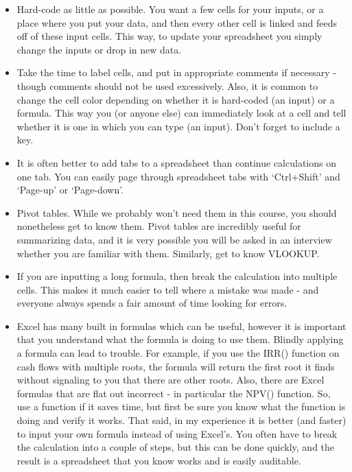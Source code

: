 \documentclass[11pt]{article}
\begin{document}
\begin{itemize}
\item Hard-code as little as possible.  You want a few cells for your inputs, or a place where you put your data, and then every other cell is linked and feeds off of these input cells. This way, to update your spreadsheet you simply change the inputs or drop in new data.
\item Take the time to label cells, and put in appropriate comments if necessary  - though comments should not be used excessively. Also, it is common to change the cell color depending on whether it is hard-coded (an input) or a formula.  This way you (or anyone else) can immediately look at a cell and tell whether it is one in which you can type (an input).  Don't forget to include a key.
\item It is often better to add tabs to a spreadsheet than continue calculations on one tab.  You can easily page through spreadsheet tabs with `Ctrl+Shift' and `Page-up' or `Page-down'.
\item Pivot tables.  While we probably won't need them in this course, you should nonetheless get to know them.  Pivot tables are incredibly useful for summarizing data, and it is very possible you will be asked in an interview whether you are familiar with them.  Similarly, get to know VLOOKUP.
\item If you are inputting a long formula, then break the calculation into multiple cells.  This makes it much easier to tell where a mistake was made - and everyone always spends a fair amount of time looking for errors.
\item Excel has many built in formulas which can be useful, however it is important that you understand what the formula is doing to use them.  Blindly applying a formula can lead to trouble.  For example, if you use the IRR() function on cash flows with multiple roots, the formula will return the first root it finds without signaling to you that there are other roots.  Also, there are Excel formulas that are flat out incorrect - in particular the NPV() function.  So, use a function if it saves time, but first be sure you know what the function is doing and verify it works.  That said, in my experience it is better (and faster) to input your own formula instead of using Excel's.  You often have to break the calculation into a couple of steps, but this can be done quickly, and the result is a spreadsheet that you know works and is easily auditable.
\end{itemize}
\end{document}
